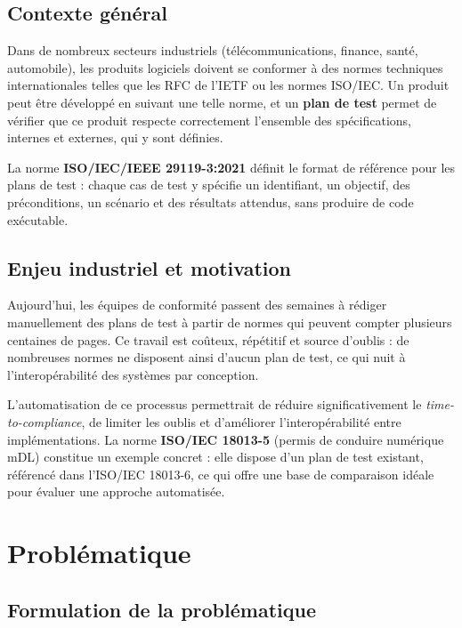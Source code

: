 \documentclass[12pt, a4paper]{article}
\begin{document}
\subsection{Contexte général}

Dans de nombreux secteurs industriels (télécommunications, finance, santé, automobile),
les produits logiciels doivent se conformer à des normes techniques internationales telles
que les RFC de l'IETF ou les normes ISO/IEC. Un produit peut être développé en suivant
une telle norme, et un \textbf{plan de test} permet de vérifier que ce produit respecte
correctement l'ensemble des spécifications, internes et externes, qui y sont définies.

La norme \textbf{ISO/IEC/IEEE 29119-3:2021} définit le format de référence pour les plans
de test : chaque cas de test y spécifie un identifiant, un objectif, des préconditions, un
scénario et des résultats attendus, sans produire de code exécutable.

\subsection{Enjeu industriel et motivation}

Aujourd'hui, les équipes de conformité passent des semaines à rédiger manuellement des
plans de test à partir de normes qui peuvent compter plusieurs centaines de pages. Ce
travail est coûteux, répétitif et source d'oublis : de nombreuses normes ne disposent ainsi
d'aucun plan de test, ce qui nuit à l'interopérabilité des systèmes par conception.

L'automatisation de ce processus permettrait de réduire significativement le
\textit{time-to-compliance}, de limiter les oublis et d'améliorer l'interopérabilité entre
implémentations. La norme \textbf{ISO/IEC 18013-5} (permis de conduire numérique mDL)
constitue un exemple concret : elle dispose d'un plan de test existant, référencé dans
l'ISO/IEC 18013-6, ce qui offre une base de comparaison idéale pour évaluer une approche
automatisée.

\section{Problématique}

\subsection{Formulation de la problématique}
\end{document}
